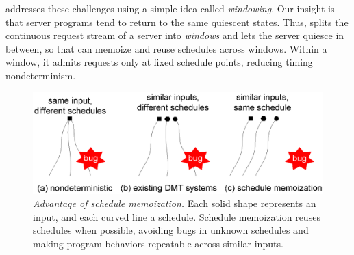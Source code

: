 \tern addresses these challenges using a simple idea called
\emph{windowing}.  Our insight is that server programs tend to return to the
same quiescent states.
Thus, \tern splits the continuous request stream of a server into
\emph{windows} and lets the server quiesce in between, so that \tern can
memoize and reuse schedules across windows.  Within a window, it admits
requests only at fixed schedule points, reducing timing nondeterminism.







\begin{figure}[t]
\centering
\includegraphics[width=.5\textwidth]{tern/figures/idea.eps}
\caption{\small{\em Advantage of schedule memoization.}  Each solid shape
  represents an input, and each curved line a schedule.  Schedule
  memoization reuses schedules when possible, avoiding bugs in unknown
  schedules and making program behaviors repeatable across similar
  inputs.}
\label{fig:idea}
\end{figure}


